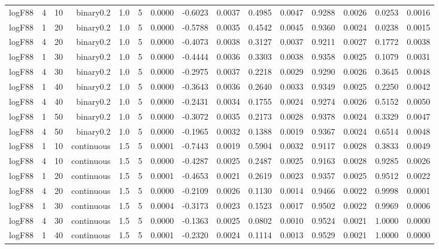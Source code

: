 \begin{longtable}{rrrrrrrrrrrrrrr}
  logF88 & 4 & 10 & binary0.2 & 1.0 & 5 & 0.0000 & -0.6023 & 0.0037 & 0.4985 & 0.0047 & 0.9288 & 0.0026 & 0.0253 & 0.0016 \\ 
  logF88 & 1 & 20 & binary0.2 & 1.0 & 5 & 0.0000 & -0.5788 & 0.0035 & 0.4542 & 0.0045 & 0.9360 & 0.0024 & 0.0238 & 0.0015 \\ 
  logF88 & 4 & 20 & binary0.2 & 1.0 & 5 & 0.0000 & -0.4073 & 0.0038 & 0.3127 & 0.0037 & 0.9211 & 0.0027 & 0.1772 & 0.0038 \\ 
  logF88 & 1 & 30 & binary0.2 & 1.0 & 5 & 0.0000 & -0.4444 & 0.0036 & 0.3303 & 0.0038 & 0.9358 & 0.0025 & 0.1079 & 0.0031 \\ 
  logF88 & 4 & 30 & binary0.2 & 1.0 & 5 & 0.0000 & -0.2975 & 0.0037 & 0.2218 & 0.0029 & 0.9290 & 0.0026 & 0.3645 & 0.0048 \\ 
  logF88 & 1 & 40 & binary0.2 & 1.0 & 5 & 0.0000 & -0.3643 & 0.0036 & 0.2640 & 0.0033 & 0.9349 & 0.0025 & 0.2250 & 0.0042 \\ 
  logF88 & 4 & 40 & binary0.2 & 1.0 & 5 & 0.0000 & -0.2431 & 0.0034 & 0.1755 & 0.0024 & 0.9274 & 0.0026 & 0.5152 & 0.0050 \\ 
  logF88 & 1 & 50 & binary0.2 & 1.0 & 5 & 0.0000 & -0.3072 & 0.0035 & 0.2173 & 0.0028 & 0.9378 & 0.0024 & 0.3329 & 0.0047 \\ 
  logF88 & 4 & 50 & binary0.2 & 1.0 & 5 & 0.0000 & -0.1965 & 0.0032 & 0.1388 & 0.0019 & 0.9367 & 0.0024 & 0.6514 & 0.0048 \\ 
  logF88 & 1 & 10 & continuous & 1.5 & 5 & 0.0001 & -0.7443 & 0.0019 & 0.5904 & 0.0032 & 0.9117 & 0.0028 & 0.3833 & 0.0049 \\ 
  logF88 & 4 & 10 & continuous & 1.5 & 5 & 0.0000 & -0.4287 & 0.0025 & 0.2487 & 0.0025 & 0.9163 & 0.0028 & 0.9285 & 0.0026 \\ 
  logF88 & 1 & 20 & continuous & 1.5 & 5 & 0.0001 & -0.4653 & 0.0021 & 0.2619 & 0.0023 & 0.9357 & 0.0025 & 0.9512 & 0.0022 \\ 
  logF88 & 4 & 20 & continuous & 1.5 & 5 & 0.0000 & -0.2109 & 0.0026 & 0.1130 & 0.0014 & 0.9466 & 0.0022 & 0.9998 & 0.0001 \\ 
  logF88 & 1 & 30 & continuous & 1.5 & 5 & 0.0004 & -0.3173 & 0.0023 & 0.1523 & 0.0017 & 0.9502 & 0.0022 & 0.9969 & 0.0006 \\ 
  logF88 & 4 & 30 & continuous & 1.5 & 5 & 0.0000 & -0.1363 & 0.0025 & 0.0802 & 0.0010 & 0.9524 & 0.0021 & 1.0000 & 0.0000 \\ 
  logF88 & 1 & 40 & continuous & 1.5 & 5 & 0.0001 & -0.2320 & 0.0024 & 0.1114 & 0.0013 & 0.9529 & 0.0021 & 1.0000 & 0.0000 \\ 

\end{longtable}
